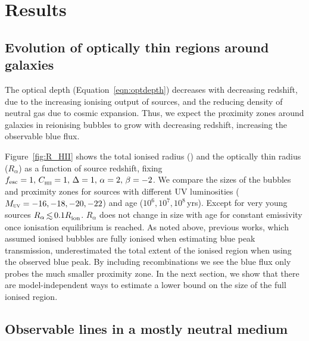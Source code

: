 \documentclass[fleqn,usenatbib]{mnras}
\begin{document}
\section{Results}
\label{sec:results}

\subsection{Evolution of optically thin regions around galaxies}
\label{sec:results_opticallythin}

The \lya optical depth (Equation~\ref{eqn:optdepth}) decreases with decreasing redshift, due to the increasing ionising output of sources, and the reducing density of neutral gas due to cosmic expansion. Thus, we expect the proximity zones around galaxies in reionising bubbles to grow with decreasing redshift, increasing the observable blue flux.

Figure~\ref{fig:R_HII} shows the total ionised radius (\Rion) and the optically thin radius ($R_\alpha$) as a function of source redshift, fixing $\fesc=1, \, \clump=1, \, \Delta=1, \, \alpha=2, \, \beta=-2$. We compare the sizes of the bubbles and proximity zones for sources with different UV luminosities ($\MUV = -16, -18, -20, -22$) and age ($10^6, 10^7, 10^8$\,yrs). Except for very young sources $R_\alpha \simlt 0.1\Rion$. $R_\alpha$ does not change in size with age for constant emissivity once ionisation equilibrium is reached. 
As noted above, previous works, which assumed ionised bubbles are fully ionised when estimating blue peak transmission, underestimated the total extent of the ionised region when using the observed blue \lya peak. By including recombinations we see the blue \lya flux only probes the much smaller proximity zone. In the next section, we show that there are model-independent ways to estimate a lower bound on the size of the full ionised region. 

\subsection{Observable \lya lines in a mostly neutral medium}
\label{sec:results_minDV}
\end{document}

